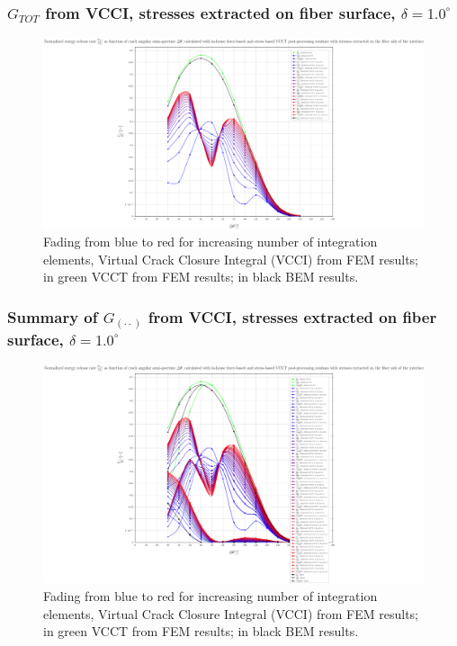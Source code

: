\begin{frame}
\frametitle{\small $G_{TOT}$ from VCCI, stresses extracted on fiber surface, $\delta=1.0^{\circ}$}
\vspace{-0.5cm}
\centering
\captionsetup[figure]{font=scriptsize,labelfont=scriptsize}
\begin{figure}[!h]
\centering
\includegraphics[height=0.7\textheight]{2017-07-25_AbqRunSummary_SmallStrain_D10/pdf/2017-07-25_AbqRunSummary_SmallStrain_D10_F-SoF-VCCT_GTOT.pdf}
  \caption{\scriptsize Fading from blue to red for increasing number of integration elements, Virtual Crack Closure Integral (VCCI) from FEM results; in green VCCT from FEM results; in black BEM results.}
  \label{fig:res1}
\end{figure}
\end{frame}
\begin{frame}
\frametitle{\small Summary of $G_{\left(\cdot\cdot\right)}$ from VCCI, stresses extracted on fiber surface, $\delta=1.0^{\circ}$}
\vspace{-0.5cm}
\centering
\captionsetup[figure]{font=scriptsize,labelfont=scriptsize}
\begin{figure}[!h]
\centering
\includegraphics[height=0.7\textheight]{2017-07-25_AbqRunSummary_SmallStrain_D10/pdf/2017-07-25_AbqRunSummary_SmallStrain_D10_F-SoF-VCCT_Summary.pdf}
  \caption{\scriptsize Fading from blue to red for increasing number of integration elements, Virtual Crack Closure Integral (VCCI) from FEM results; in green VCCT from FEM results; in black BEM results.}
  \label{fig:res1}
\end{figure}
\end{frame}

